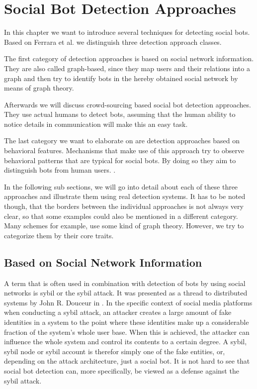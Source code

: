 



\section{Social Bot Detection Approaches}
In this chapter we want to introduce several techniques for detecting social bots. Based on Ferrara et al. \cite{ferrara15} we distinguish three detection approach classes. 

The first category of detection approaches is based on social network information. They are also called graph-based, since they map users and their relations into a graph and then try to identify bots in the hereby obtained social network by means of graph theory. 

Afterwards we will discuss crowd-sourcing based social bot detection approaches. They use actual humans to detect bots, assuming that the human ability to notice details in communication will make this an easy task.

The last category we want to elaborate on are detection approaches based on behavioral features. Mechanisms that make use of this approach try to observe behavioral patterns that are typical for social bots. By doing so they aim to distinguish bots from human users. \cite{ferrara15}. %


In the following sub sections, we will go into detail about each of these three approaches and illustrate them using real detection systems. It has to be noted though, that the borders between the individual approaches is not always very clear, so that some examples could also be mentioned in a different category. Many schemes for example, use some kind of graph theory. However, we try to categorize them by their core traits.

\subsection{Based on Social Network Information}
A term that is often used in combination with detection of bots by using social networks is sybil or the sybil attack. It was presented as a thread to distributed systems by John R. Douceur in \cite{sybil}. In the specific context of social media platforms when conducting a sybil attack, an attacker creates a large amount of fake identities in a system to the point where these identities make up a considerable fraction of the system's whole user base. When this is achieved, the attacker can influence the whole system and control its contents to a certain degree. A sybil, sybil node or sybil account is therefor simply one of the fake entities, or, depending on the attack architecture, just a social bot. It is not hard to see that social bot detection can, more specifically, be viewed as a defense against the sybil attack.   

